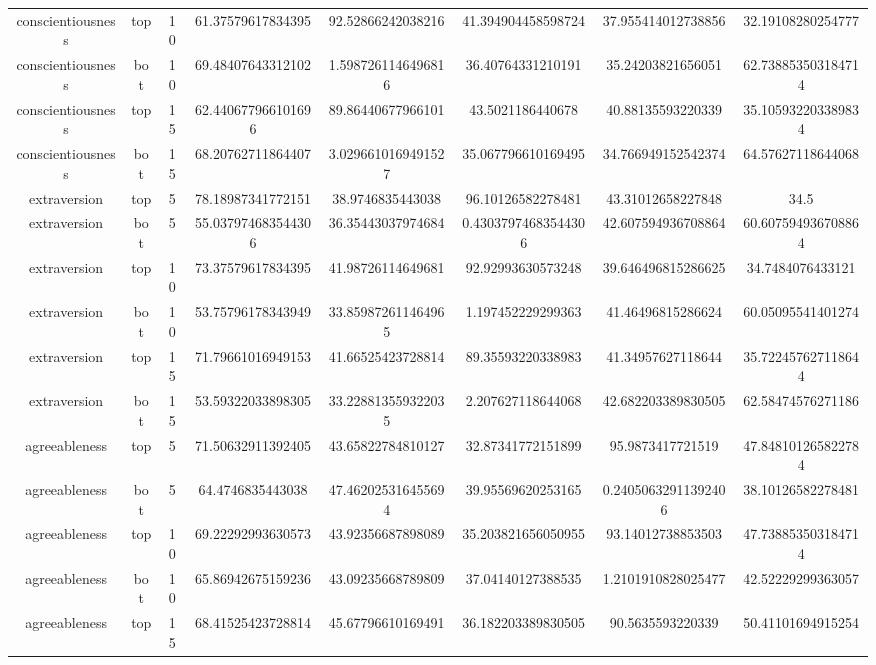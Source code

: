 \documentclass{DESSThesis}
\begin{document}
\begin{table}[]
{\begin{tabular}{cccccccc}
conscientiousness & top      & 10   & 61.37579617834395  & 92.52866242038216  & 41.394904458598724  & 37.955414012738856  & 32.19108280254777  \\
conscientiousness & bot      & 10   & 69.48407643312102  & 1.5987261146496816 & 36.40764331210191   & 35.24203821656051   & 62.738853503184714 \\
conscientiousness & top      & 15   & 62.440677966101696 & 89.86440677966101  & 43.5021186440678    & 40.88135593220339   & 35.105932203389834 \\
conscientiousness & bot & 15 & 68.20762711864407 & 3.0296610169491527 & 35.067796610169495 & 34.766949152542374 & 64.57627118644068 \\
extraversion      & top      & 5    & 78.18987341772151  & 38.9746835443038   & 96.10126582278481   & 43.31012658227848   & 34.5               \\
extraversion      & bot      & 5    & 55.037974683544306 & 36.35443037974684  & 0.43037974683544306 & 42.607594936708864  & 60.607594936708864 \\
extraversion      & top      & 10   & 73.37579617834395  & 41.98726114649681  & 92.92993630573248   & 39.646496815286625  & 34.7484076433121   \\
extraversion      & bot      & 10   & 53.75796178343949  & 33.859872611464965 & 1.197452229299363   & 41.46496815286624   & 60.05095541401274  \\
extraversion      & top      & 15   & 71.79661016949153  & 41.66525423728814  & 89.35593220338983   & 41.34957627118644   & 35.722457627118644 \\
extraversion      & bot      & 15   & 53.59322033898305  & 33.228813559322035 & 2.207627118644068   & 42.682203389830505  & 62.58474576271186  \\
agreeableness     & top      & 5    & 71.50632911392405  & 43.65822784810127  & 32.87341772151899   & 95.9873417721519    & 47.848101265822784 \\
agreeableness     & bot      & 5    & 64.4746835443038   & 47.462025316455694 & 39.95569620253165   & 0.24050632911392406 & 38.10126582278481  \\
agreeableness     & top      & 10   & 69.22292993630573  & 43.92356687898089  & 35.203821656050955  & 93.14012738853503   & 47.738853503184714 \\
agreeableness     & bot      & 10   & 65.86942675159236  & 43.09235668789809  & 37.04140127388535   & 1.2101910828025477  & 42.52229299363057  \\
agreeableness     & top      & 15   & 68.41525423728814  & 45.67796610169491  & 36.182203389830505  & 90.5635593220339    & 50.41101694915254  \\

\end{tabular}}
\end{table}
\end{document}
